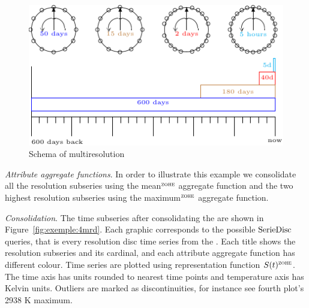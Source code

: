 \begin{figure}[tp]
  \centering
  \setlength{\unitlength}{1.3mm}
  \includegraphics{fig_exemple_window.pdf}
  \caption{Schema of multiresolution}
  \label{fig:exemple:window}
\end{figure}

\emph{Attribute aggregate functions}.  In order to illustrate this
example we consolidate all the resolution subseries using the
mean$^\zohe{}$ aggregate function and the two highest resolution
subseries using the maximum$^\zohe{}$ aggregate function. 



\emph{Consolidation}. The time subseries after consolidating the
 are shown in Figure~\ref{fig:exemple:4mrd}. 
Each graphic corresponds to the possible $\operatorname{SerieDisc}$ queries, that is
every resolution disc time series from the . Each title
shows the resolution subseries and its cardinal, and each attribute
aggregate function has different colour.  
%
Time series are plotted using \zohe{} representation function
$S(t)^\zohe{}$. The time axis has  units rounded to nearest
time points and temperature axis has Kelvin units. Outliers are
marked as discontinuities, for instance see fourth plot's 2938 K
maximum.

